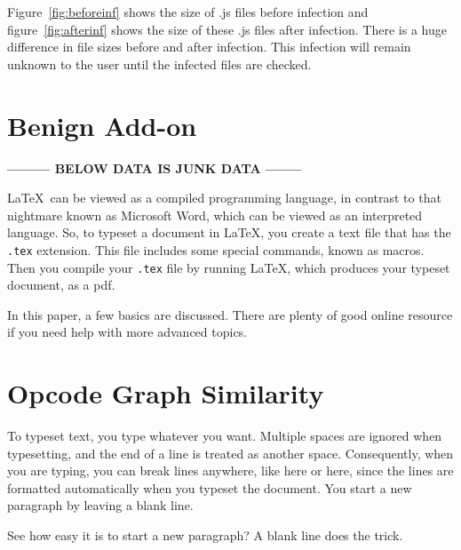 Figure~\ref{fig:beforeinf} shows the size of .js files before infection and figure~\ref{fig:afterinf} shows the size of these .js files after infection. There is a huge difference in file sizes before and after infection. This infection will remain unknown to the user until the infected files are checked.

\section{Benign Add-on} 

\textbf{——— BELOW DATA IS JUNK DATA ——–}

	
\LaTeX\ can be viewed
as a compiled programming language, in contrast to that 
nightmare known as Microsoft Word,
which can be viewed as an interpreted language. So, to typeset a
document in \LaTeX, you create a text file that has the {\tt .tex} extension.
This file includes some special
commands, known as macros. Then
you compile your {\tt .tex} file by running  \LaTeX,
which produces your typeset document, as a pdf. 

In this paper, a few basics are discussed. There are plenty of good online resource
if you need help with more advanced topics.


\section{Opcode Graph Similarity} 

To typeset text, you type whatever you want. Multiple spaces are
ignored                           when typesetting, and
the end of a line is treated as another space.
Consequently, when you are typing, you can break lines anywhere, like here
or here,
since the lines are formatted automatically when you typeset the document.
You start a new paragraph by leaving a blank line.

See how easy it is to start a new paragraph? A blank line does the trick.


